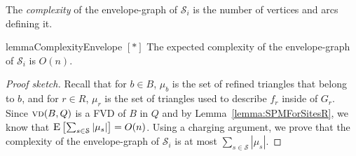 \documentclass[a4paper,UKenglish]{socg-lipics-v2018}
\newcommand{\s}{\mathcal S}
\newcommand{\vd}[2][P]{\textsc{vd}(#2, #1)}
\newcommand{\ex}[1]{\textsc{E}\left[#1\right]}
\begin{document}
The \emph{complexity} of the envelope-graph of $\s_i$ is the number of vertices and arcs defining it.

\begin{restatable}{lemma}{ComplexityEnvelope}\label{lemma: Complexity of envelope-graph}
\hyperref[ProofComplexityEnvelope]{$[*]$}
The expected complexity of the envelope-graph of $\s_i$ is $O(n)$.
\end{restatable}
\begin{proof}[Proof sketch]
Recall that for $b\in B$, $\mu_b$ is the set of refined triangles that belong to $b$, and for $r\in R$, $\mu_r$ is the set of triangles used to describe $f_r$ inside of $G_r$. Since $\vd[Q]{B}$ is a FVD of $B$ in $Q$ and by Lemma~\ref{lemma:SPMForSitesR}, we know that $\ex{\sum_{s\in \s} |\mu_s|} = O(n)$. 
Using a charging argument, we prove that the complexity of the envelope-graph of $\s_i$ is at most $\sum_{s\in \s} |\mu_s|$.
\end{proof}
\end{document}
